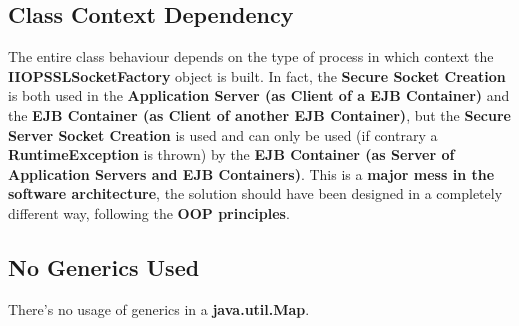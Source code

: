 \subsection{Class Context Dependency}
The entire class behaviour depends on the type of process in which context the \textbf{IIOPSSLSocketFactory} object is built.
In fact, the \textbf{Secure Socket Creation} is both used in the \textbf{Application Server (as Client of a EJB Container)} and the \textbf{EJB Container (as Client of another EJB Container)}, but the \textbf{Secure Server Socket Creation} is used and can only be used (if contrary a \textbf{RuntimeException} is thrown) by the \textbf{EJB Container (as Server of Application Servers and EJB Containers)}.
This is a \textbf{major mess in the software architecture}, the solution should have been designed in a completely different way, following the \textbf{OOP principles}.

\subsection{No Generics Used}
There's no usage of generics in a \textbf{java.util.Map}.